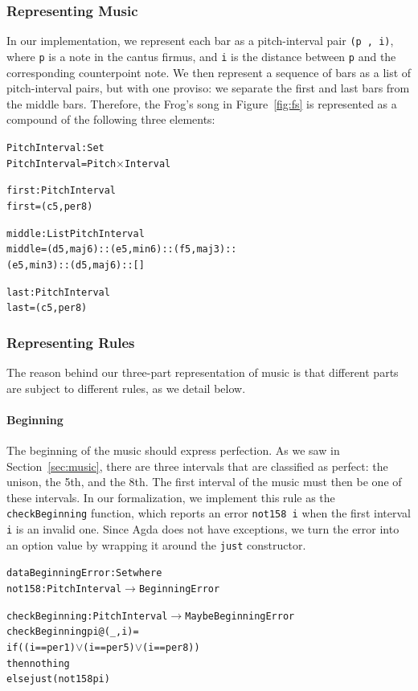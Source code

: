 \subsubsection{Representing Music}

In our implementation, we represent each bar as a pitch-interval
pair \texttt{(p ,  i)}, where \texttt{p} is a note in the cantus firmus,
and \texttt{i} is the distance between \texttt{p} and the corresponding
counterpoint note.
We then represent a sequence of bars as a list of pitch-interval pairs,
but with one proviso: we separate the first and last bars from the
middle bars.
Therefore, the Frog's song in Figure~\ref{fig:fs} is represented as a
compound of the following three elements:

\begin{alltt}
PitchInterval : Set
PitchInterval = Pitch \(\times\) Interval

first : PitchInterval
first = (c 5 , per8)

middle : List PitchInterval
middle = (d 5 , maj6) :: (e 5 , min6) :: (f 5 , maj3) ::
         (e 5 , min3) :: (d 5 , maj6) :: []

last : PitchInterval
last = (c 5 , per8)
\end{alltt}

\subsubsection{Representing Rules}

The reason behind our three-part representation of music is that
different parts are subject to different rules, as we detail below.

\paragraph{Beginning}

The beginning of the music should express perfection.
As we saw in Section~\ref{sec:music}, there are three intervals that
are classified as perfect: the unison, the 5th, and the 8th.
The first interval of the music must then be one of these intervals.
In our formalization, we implement this rule as the
\texttt{checkBeginning} function, which reports an error
\texttt{not158 i} when the first interval \texttt{i} is an invalid one.
Since Agda does not have exceptions, we turn the error into an option
value by wrapping it around the \texttt{just} constructor.

\begin{alltt}
data BeginningError : Set where
  not158   : PitchInterval \(\rightarrow\) BeginningError
  
checkBeginning : PitchInterval \(\rightarrow\) Maybe BeginningError
checkBeginning pi@(_ , i) =
  if ((i == per1) \(\vee\) (i == per5) \(\vee\) (i == per8))
  then nothing
  else just (not158 pi)
\end{alltt}

